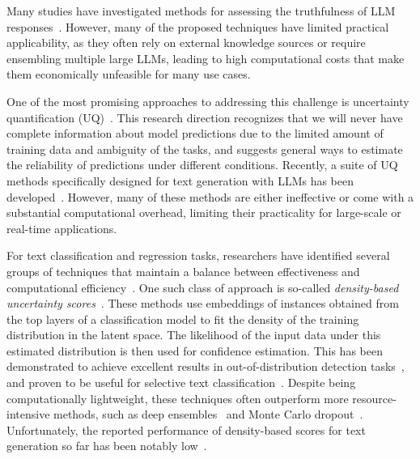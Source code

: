 \documentclass[11pt]{article}
\begin{document}
  Many studies have investigated methods for assessing the truthfulness of LLM responses~\cite{manakul2023selfcheckgpt,min2023factscore,chen2023hallucination,feng-etal-2024-dont}. However, many of the proposed techniques have limited practical applicability, as they often rely on external knowledge sources or require ensembling multiple large LLMs, leading to high computational costs that make them economically unfeasible for many use cases.

  One of the most promising approaches to addressing this challenge is uncertainty quantification (UQ)~\cite{gal2016dropout,shelmanov-etal-2021-certain,baan2023uncertainty,geng2023survey,fadeeva2023lm}. This research direction recognizes that we will never have complete information about model predictions due to the limited amount of training data and ambiguity of the tasks, and suggests general ways to estimate the reliability of predictions under different conditions.
  Recently, a suite of UQ methods specifically designed for text generation with LLMs has been developed~\cite{fomicheva-etal-2020-unsupervised,lin2023generating,kuhn2023semantic,farquhar2024detecting,duan-etal-2024-shifting}. However, many of these methods are either ineffective or come with a substantial computational overhead, limiting their practicality for large-scale or real-time applications.

  For text classification and regression tasks, researchers have identified several groups of techniques that maintain a balance between effectiveness and computational efficiency~\cite{zhang-etal-2019-mitigating,he2020towards,xin-etal-2021-art,wang-etal-2022-uncertainty,vazhentsev-etal-2023-hybrid,he-etal-2024-uncertainty}. One such class of approach is so-called \textit{density-based uncertainty scores}~\cite{lee2018simple,ddu_amersfoort,nuq_kotelevskii,yoo-etal-2022-detection}. These methods use embeddings of instances obtained from the top layers of a classification model to fit the density of the training distribution in the latent space. The likelihood of the input data under this estimated distribution is then used for confidence estimation.
  This has been demonstrated to achieve excellent results in out-of-distribution detection tasks~\cite{podolskiy2021revisiting}, and proven to be useful for selective text classification~\cite{vazhentsev-etal-2022-uncertainty,vazhentsev-etal-2023-hybrid}. 
  Despite being computationally lightweight, these techniques often outperform more resource-intensive methods, such as deep ensembles~\cite{NIPS2017_9ef2ed4b} and Monte Carlo dropout~\cite{gal2016dropout,tsymbalov2018dropout}. Unfortunately, the reported performance of density-based scores for text generation so far has been notably low~\cite{vashurin2024benchmakring}. 
\end{document}
